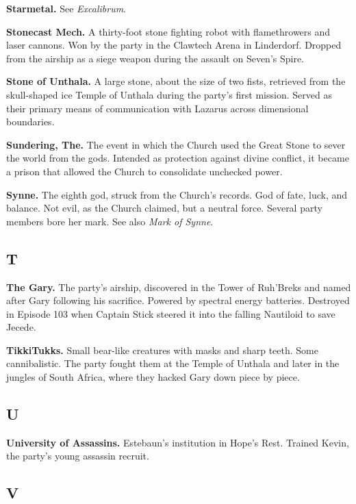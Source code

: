\smallskip \noindent
\textbf{Starmetal.} See \textit{Excalibrum}.

\smallskip \noindent
\textbf{Stonecast Mech.} A thirty-foot stone fighting robot with flamethrowers and laser cannons. Won by the party in the Clawtech Arena in Linderdorf. Dropped from the airship as a siege weapon during the assault on Seven's Spire.

\smallskip \noindent
\textbf{Stone of Unthala.} A large stone, about the size of two fists, retrieved from the skull-shaped ice Temple of Unthala during the party's first mission. Served as their primary means of communication with Lazarus across dimensional boundaries.

\smallskip \noindent
\textbf{Sundering, The.} The event in which the Church used the Great Stone to sever the world from the gods. Intended as protection against divine conflict, it became a prison that allowed the Church to consolidate unchecked power.

\smallskip \noindent
\textbf{Synne.} The eighth god, struck from the Church's records. God of fate, luck, and balance. Not evil, as the Church claimed, but a neutral force. Several party members bore her mark. See also \textit{Mark of Synne}.

\subsection*{T}

\noindent
\textbf{The Gary.} The party's airship, discovered in the Tower of Ruh'Breks and named after Gary following his sacrifice. Powered by spectral energy batteries. Destroyed in Episode 103 when Captain Stick steered it into the falling Nautiloid to save Jecede.

\smallskip \noindent
\textbf{TikkiTukks.} Small bear-like creatures with masks and sharp teeth. Some cannibalistic. The party fought them at the Temple of Unthala and later in the jungles of South Africa, where they hacked Gary down piece by piece.

\subsection*{U}

\noindent
\textbf{University of Assassins.} Estebaun's institution in Hope's Rest. Trained Kevin, the party's young assassin recruit.

\subsection*{V}

